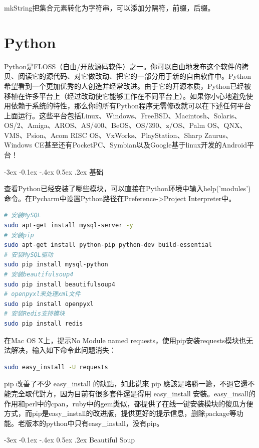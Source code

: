 \documentclass[11pt,fleqn]{book}
\makeatletter
\numberwithin{dummy}{section}
\theoremstyle{ocrenumbox}
\theoremstyle{blacknumex}
\theoremstyle{blacknumbox}
\theoremstyle{ocrenum}
\renewcommand{\subsection}{\@startsection {subsection}{2}{\z@}
	{-3ex \@plus -0.1ex \@minus -.4ex}
	{0.5ex \@plus.2ex }
	{\normalfont\sffamily\bfseries}}
\makeatother
\begin{document}
mkString把集合元素转化为字符串，可以添加分隔符，前缀，后缀。

\chapter{Python}

Python是FLOSS（自由/开放源码软件）之一。你可以自由地发布这个软件的拷贝、阅读它的源代码、对它做改动、把它的一部分用于新的自由软件中。Python希望看到一个更加优秀的人创造并经常改进。由于它的开源本质，Python已经被移植在许多平台上（经过改动使它能够工作在不同平台上）。如果你小心地避免使用依赖于系统的特性，那么你的所有Python程序无需修改就可以在下述任何平台上面运行。这些平台包括Linux、Windows、FreeBSD、Macintosh、Solaris、OS/2、Amiga、AROS、AS/400、BeOS、OS/390、z/OS、Palm OS、QNX、VMS、Psion、Acom RISC OS、VxWorks、PlayStation、Sharp Zaurus、Windows CE甚至还有PocketPC、Symbian以及Google基于linux开发的Android平台！

\subsection{基础}

查看Python已经安装了哪些模块，可以直接在Python环境中输入help('modules')命令。在Pycharm中设置Python路径在Preference->Project Interpreter中。

\begin{lstlisting}[language=Bash]
# 安装MySQL
sudo apt-get install mysql-server -y
# 安装pip
sudo apt-get install python-pip python-dev build-essential
# 安装MySQL驱动
sudo pip install mysql-python
# 安装beautifulsoup4
sudo pip install beautifulsoup4
# openpyxl来处理xml文件
sudo pip install openpyxl
# 安装Redis支持模块
sudo pip install redis
\end{lstlisting}

在Mac OS X上，提示No Module named requests，使用pip安装requests模块也无法解决，输入如下命令此问题消失：

\begin{lstlisting}[language=Bash]
sudo easy_install -U requests
\end{lstlisting}

pip 改善了不少 easy\_install 的缺點，如此说來 pip 應該是略勝一籌，不過它還不能完全取代對方，因为目前有很多套件還是得用 easy\_install 安裝。easy\_insall的作用和perl中的cpan，ruby中的gem类似，都提供了在线一键安装模块的傻瓜方便方式，而pip是easy\_install的改进版，提供更好的提示信息，删除package等功能。老版本的python中只有easy\_install，没有pip。

\subsection{Beautiful Soup}
\end{document}
